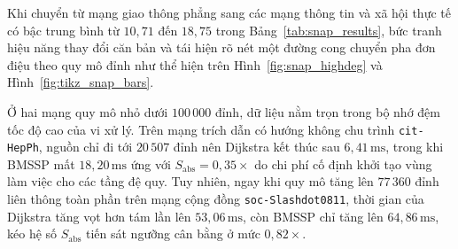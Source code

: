 Khi chuyển từ mạng giao thông phẳng sang các mạng thông tin và xã hội thực tế có bậc trung bình từ $10{,}71$ đến $18{,}75$ trong Bảng~\ref{tab:snap_results}, bức tranh hiệu năng thay đổi căn bản và tái hiện rõ nét một đường cong chuyển pha đơn điệu theo quy mô đỉnh như thể hiện trên Hình~\ref{fig:snap_highdeg} và Hình~\ref{fig:tikz_snap_bars}.

\begin{table}[!htb]
\centering
{}
\caption{Thời gian giải trung vị tính bằng ms và hệ số tăng tốc trên 5 mạng thực tế bậc cao từ kho dữ liệu Stanford SNAP.}
\label{tab:snap_results}
\end{table}

Ở hai mạng quy mô nhỏ dưới $100\,000$ đỉnh, dữ liệu nằm trọn trong bộ nhớ đệm tốc độ cao của vi xử lý. Trên mạng trích dẫn có hướng không chu trình \texttt{cit-HepPh}, nguồn chỉ đi tới $20\,507$ đỉnh nên Dijkstra kết thúc sau $6{,}41\,\mathrm{ms}$, trong khi BMSSP mất $18{,}20\,\mathrm{ms}$ ứng với $S_{\mathrm{abs}} = 0{,}35\times$ do chi phí cố định khởi tạo vùng làm việc cho các tầng đệ quy. Tuy nhiên, ngay khi quy mô tăng lên $77\,360$ đỉnh liên thông toàn phần trên mạng cộng đồng \texttt{soc-Slashdot0811}, thời gian của Dijkstra tăng vọt hơn tám lần lên $53{,}06\,\mathrm{ms}$, còn BMSSP chỉ tăng lên $64{,}86\,\mathrm{ms}$, kéo hệ số $S_{\mathrm{abs}}$ tiến sát ngưỡng cân bằng ở mức $0{,}82\times$.

